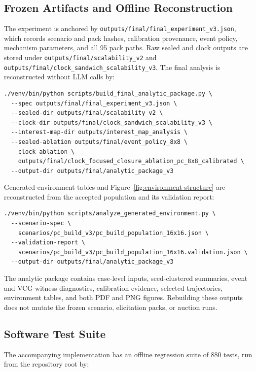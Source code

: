 \subsection{Frozen Artifacts and Offline Reconstruction}

The experiment is anchored by
\texttt{outputs/final/final\_experiment\_v3.json}, which records scenario and
pack hashes, calibration provenance, event policy, mechanism parameters, and
all 95 pack paths. Raw sealed and clock outputs are stored under
\texttt{outputs/final/scalability\_v2} and
\texttt{outputs/final/clock\_sandwich\_scalability\_v3}. The final analysis
is reconstructed without LLM calls by:

\begin{verbatim}
./venv/bin/python scripts/build_final_analytic_package.py \
  --spec outputs/final/final_experiment_v3.json \
  --sealed-dir outputs/final/scalability_v2 \
  --clock-dir outputs/final/clock_sandwich_scalability_v3 \
  --interest-map-dir outputs/interest_map_analysis \
  --sealed-ablation outputs/final/event_policy_8x8 \
  --clock-ablation \
    outputs/final/clock_focused_closure_ablation_pc_8x8_calibrated \
  --output-dir outputs/final/analytic_package_v3
\end{verbatim}

Generated-environment tables and Figure~\ref{fig:environment-structure} are
reconstructed from the accepted population and its validation report:

\begin{verbatim}
./venv/bin/python scripts/analyze_generated_environment.py \
  --scenario-spec \
    scenarios/pc_build_v3/pc_build_population_16x16.json \
  --validation-report \
    scenarios/pc_build_v3/pc_build_population_16x16.validation.json \
  --output-dir outputs/final/analytic_package_v3
\end{verbatim}

The analytic package contains case-level inputs, seed-clustered summaries,
event and VCG-witness diagnostics, calibration evidence, selected trajectories,
environment tables, and both PDF and PNG figures. Rebuilding these outputs
does not mutate the frozen scenario, elicitation packs, or auction runs.

\subsection{Software Test Suite}
\label{app:test-suite}

The accompanying implementation has an offline regression suite of 880 tests,
run from the repository root by:

